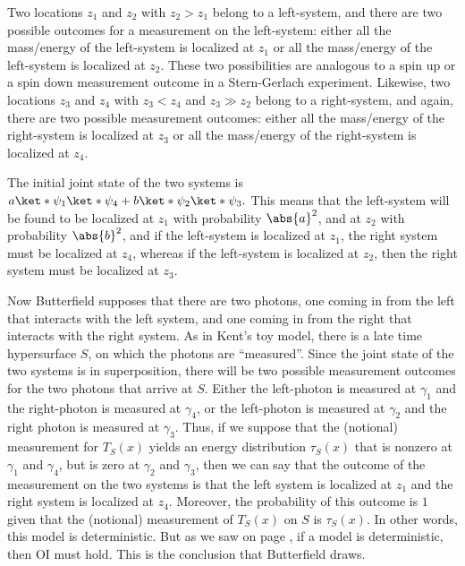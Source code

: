 \documentclass[12pt]{report}
\begin{document}
Two locations $z_1$ and $z_2$ with $z_2>z_1$ belong to a left-system, and there are two possible outcomes for a measurement on the left-system: either all the mass/energy of the left-system is localized at $z_1$ or all the mass/energy of the left-system  is localized at $z_2$. These two possibilities are analogous to a spin up or a spin down measurement outcome in a Stern-Gerlach experiment. Likewise, two locations $z_3$ and $z_4$ with $z_3<z_4$ and $z_3\gg z_2$ %
%
 belong to a right-system, and again, there are two possible measurement outcomes: either all the mass/energy of the right-system is localized at $z_3$ or all the mass/energy of the right-system  is localized at $z_4$.  

The initial joint state of the two systems is 
$a \ket*{\psi_1}\ket*{\psi_4} +b \ket*{\psi_2}\ket*{\psi_3}.$
This means that the left-system will be found to be localized at $z_1$ with probability $\abs{a}^2$, and at $z_2$ with probability $\abs{b}^2$, and if the left-system is localized at $z_1$, the  right system must be localized at $z_4$, whereas if the left-system is localized at $z_2$, then the right system must be localized at $z_3$.  

Now Butterfield supposes that there are two photons, one coming in from the left that interacts with the left system, and one coming in from the right that interacts with the right system. As in Kent's toy model, there is a late time hypersurface $S$, on which the photons are ``measured''. Since the joint state of the two systems  is in superposition, there will be two possible measurement outcomes for the two photons that arrive at $S$. Either the left-photon is measured at $\gamma_1$ and the right-photon is measured at $\gamma_4$, or the left-photon is measured at $\gamma_2$ and the right photon is measured at $\gamma_3$. Thus, if we suppose that the (notional) measurement for $T_S(x)$ yields an energy distribution $\tau_S(x)$ that is nonzero at $\gamma_1$ and $\gamma_4$, but is zero at $\gamma_2$ and $\gamma_3$, then we can say that the outcome of the measurement on the two systems is that the left system is localized at $z_1$ and the right system is localized at $z_4$. Moreover, the probability of this outcome is $1$ given that the (notional) measurement of $T_S(x)$ on $S$ is $\tau_S(x)$. In other words, this model is deterministic. But as we saw on page \pageref{OIdet}, if a model is deterministic, then OI must hold. This is the conclusion that Butterfield draws. 
\end{document}
